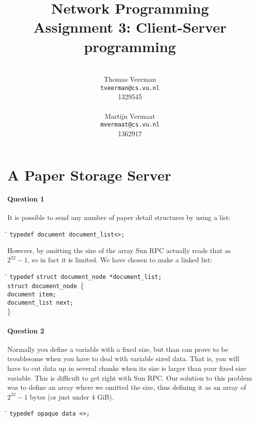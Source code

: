 \documentclass[a4paper,10pt]{article}
\title{Network Programming\\
\small{Assignment 3: Client-Server programming}}
\author{%
        \mbox{}\\
        Thomas Veerman\\
        \texttt{tveerman@cs.vu.nl}\\
        1329545\\
        \mbox{}\\
        Martijn Vermaat\\
        \texttt{mvermaat@cs.vu.nl}\\
        1362917
}
\begin{document}
\maketitle

\section{A Paper Storage Server}
\paragraph{Question 1}
It is possible to send any number of paper detail structures by using a list:

\begin{tabbing}
\hspace{20pt}\=\kill
 \>\texttt{typedef document document\_list<>;}
\end{tabbing}

However, by omitting the size of the array Sun RPC actually reads that as $2^{32} - 1$, so in fact it is limited. We have chosen to make a linked list:

\begin{tabbing}
\hspace{20pt}\=\kill
 \> \texttt{type}\=\texttt{def} \texttt{struct document\_node *document\_list;}\\ 
 \> \texttt{struct document\_node }\{ \+ \\
 \> \texttt{document item;}\\ 
 \> \texttt{document\_list next;} \- \\
 \> \} 
\end{tabbing}

\paragraph{Question 2}
Normally you define a variable with a fixed size, but than can prove to be troublesome when you have to deal with variable sized data. That is, you will have to cut data up in several chunks when its size is larger than your fixed size variable. This is difficult to get right with Sun RPC. Our solution to this problem was to define an array where we omitted the size, thus defining it as an array of $2^{32} - 1$ bytes (or just under 4 GiB).

\begin{tabbing}
\hspace{20pt}\=\kill
 \>\texttt{typedef opaque data <>;}
\end{tabbing}
\end{document}
